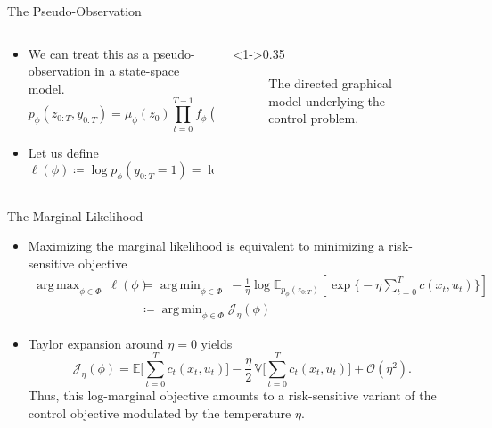 \documentclass[10pt, aspectratio=1610]{beamer}
\DeclareMathOperator*{\argmin}{arg\,min}
\DeclareMathOperator*{\argmax}{arg\,max}
\begin{document}
    \begin{frame}{The Pseudo-Observation}
      \begin{columns}
        \begin{column}{0.65\textwidth}
          \begin{itemize}
            \item<1-> We can treat this as a pseudo-observation in a state-space model.
              \begin{equation}\label{eq:paper_1_ssm}
                p_{\phi}(z_{0:T}, y_{0:T}) = \mu_{\phi}(z_0) \prod_{t=0}^{T-1} f_{\phi}(z_{t+1} \mid z_t) \prod_{t=0}^T g(y_t \mid z_t).
              \end{equation}
            \item<2-> Let us define
              \begin{equation}
                \ell(\phi) \coloneq \log p_\phi(y_{0:T} = 1) = \log \mathbb{E}_{p_\phi(z_{0:T})} \bigl[ p(y_{0:T} = 1 \mid z_{0:T}) \bigr]
              \end{equation}
          \end{itemize}
        \end{column}
        \begin{column}<1->{0.35\textwidth}
          \begin{figure}[htbp]
            \centering
            
            \caption{The directed graphical model underlying the control problem.}
          \end{figure}
        \end{column}
      \end{columns}
    \end{frame}

    \begin{frame}{The Marginal Likelihood}
      \begin{itemize}[<+->]
        \item Maximizing the marginal likelihood is equivalent to minimizing a risk-sensitive objective
          \begin{align}\label{eq:max_likelihood}
            \argmax_{\phi \in \Phi} \medspace \ell(\phi) &= \argmin_{\phi \in \Phi} \medspace -\frac{1}{\eta}\log \mathbb{E}_{p_{\phi}(z_{0:T})} \left[ \exp \big\{-\eta \textstyle \sum_{t=0}^{T} c(x_{t}, u_{t}) \big\} \right] \\
            &\coloneq \argmin_{\phi \in \Phi} \mathcal{J}_\eta(\phi)
          \end{align}
        \item Taylor expansion around $\eta = 0$ yields
          \begin{equation}
            \mathcal{J}_\eta(\phi) = \mathbb{E} \Bigg[ \sum_{t=0}^{T} c_{t}(x_{t}, u_{t}) \Bigg] - \frac{\eta}{2} \, \mathbb{V} \Bigg[ \sum_{t=0}^{T} c_{t}(x_{t}, u_{t}) \Bigg] + \mathcal{O}(\eta^{2}).
          \end{equation}
          Thus, this log-marginal objective amounts to a risk-sensitive variant of the control objective modulated by the temperature $\eta$.
      \end{itemize}
    \end{frame}
\end{document}
